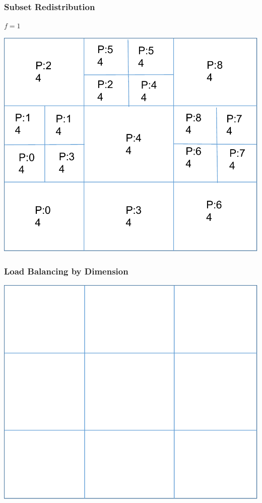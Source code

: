 \documentclass[]{beamer}
\begin{document}
\begin{frame}[t]\frametitle{Subset Redistribution}
\begin{minipage}{0.15\textwidth}
\begin{footnotesize}
$f = 1$
\end{footnotesize}
\end{minipage}
\begin{minipage}{0.8\textwidth}
\centering
\includegraphics[scale=0.5]{figures/domain_overloading.pdf}
\end{minipage}
\end{frame}

\begin{frame}[t]\frametitle{Load Balancing by Dimension}
\centering
\includegraphics[scale=0.5]{figures/initial_1b.pdf}
\end{frame}
\end{document}
